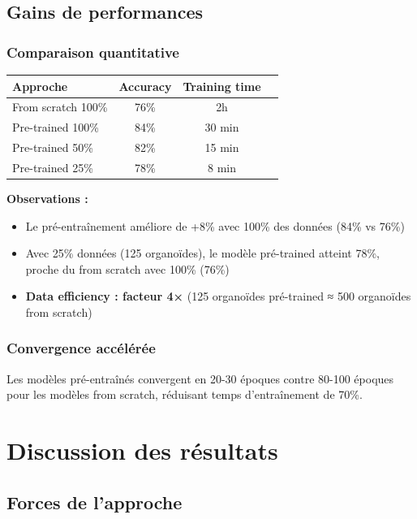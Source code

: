 \subsection{Gains de performances}

\subsubsection{Comparaison quantitative}

\begin{center}
\begin{tabular}{|l|c|c|c|}
\hline
\textbf{Approche} & \textbf{Accuracy} & \textbf{Training time} \\
\hline
From scratch 100\% & 76\% & 2h \\
Pre-trained 100\% & 84\% & 30 min \\
Pre-trained 50\% & 82\% & 15 min \\
Pre-trained 25\% & 78\% & 8 min \\
\hline
\end{tabular}
\end{center}

\textbf{Observations :}
\begin{itemize}
    \item Le pré-entraînement améliore de +8\% avec 100\% des données (84\% vs 76\%)
    \item Avec 25\% données (125 organoïdes), le modèle pré-trained atteint 78\%, proche du from scratch avec 100\% (76\%)
    \item \textbf{Data efficiency : facteur 4×} (125 organoïdes pré-trained ≈ 500 organoïdes from scratch)
\end{itemize}

\subsubsection{Convergence accélérée}

Les modèles pré-entraînés convergent en 20-30 époques contre 80-100 époques pour les modèles from scratch, réduisant temps d'entraînement de 70\%.

\section{Discussion des résultats}

\subsection{Forces de l'approche}

